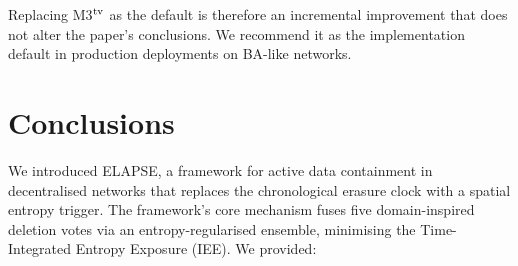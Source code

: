 \documentclass[review,12pt]{elsarticle}
\begin{document}
Replacing M3$^{\rm tv}$ as the default is therefore an incremental improvement
that does not alter the paper's conclusions.  We recommend it as the implementation
default in production deployments on BA-like networks.

\section{Conclusions}
\label{sec:conclusions}

We introduced ELAPSE, a framework for active data containment in
decentralised networks that replaces the chronological erasure clock with a
spatial entropy trigger. The framework's core mechanism fuses five
domain-inspired deletion votes via an entropy-regularised ensemble,
minimising the Time-Integrated Entropy Exposure (IEE). We provided:
\end{document}

